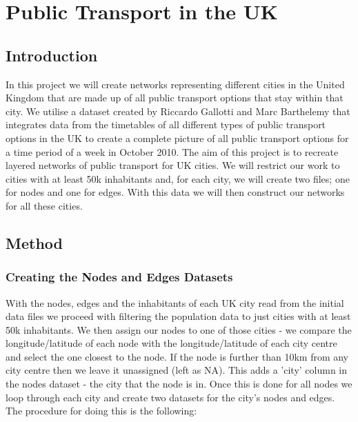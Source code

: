 \chapter{Public Transport in the UK}



\section{Introduction}
    In this project we will create networks representing different cities in the United Kingdom that are made up of all public transport options that stay within that city. We utilise a dataset created by Riccardo Gallotti and Marc Barthelemy \cite{Gallotti2015} that integrates data from the timetables of all different types of public transport options in the UK to create a complete picture of all public transport options for a time period of a week in October 2010.
    The aim of this project is to recreate layered networks of public transport for UK cities. We will restrict our work to cities with at least 50k inhabitants \cite{worldpopReview2025} and, for each city, we will create two files; one for nodes and one for edges. With this data we will then construct our networks for all these cities.

\section{Method}
\subsection{Creating the Nodes and Edges Datasets}

    With the nodes, edges and the inhabitants of each UK city read from the initial data files we proceed with filtering the population data to just cities with at least 50k inhabitants. We then assign our nodes to one of those cities - we compare the longitude/latitude of each node with the longitude/latitude of each city centre and select the one closest to the node. If the node is further than 10km from any city centre then we leave it unassigned (left as NA).
    This adds a 'city' column in the nodes dataset - the city that the node is in. Once this is done for all nodes we loop through each city and create two datasets for the city's nodes and edges. The procedure for doing this is the following:

